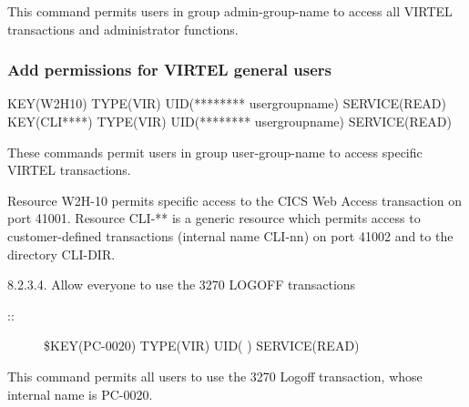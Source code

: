 \documentclass[letterpaper,10pt,english]{sphinxmanual}
\begin{document}

This command permits users in group admin-group-name to access all VIRTEL transactions and administrator functions.

\ignorespaces 

\subsubsection{Add permissions for VIRTEL general users}
\label{\detokenize{Installation_Guide:add-permissions-for-virtel-general-users}}\label{\detokenize{Installation_Guide:index-183}}
\begin{sphinxVerbatim}[commandchars=\\\{\}]
\PYGZdl{}KEY(W2H\PYGZhy{}10) TYPE(VIR) UID(******** user\PYGZhy{}group\PYGZhy{}name) SERVICE(READ)
\PYGZdl{}KEY(CLI\PYGZhy{}****) TYPE(VIR) UID(******** user\PYGZhy{}group\PYGZhy{}name) SERVICE(READ)
\end{sphinxVerbatim}


These commands permit users in group user-group-name to access specific VIRTEL transactions.

Resource W2H-10 permits specific access to the CICS Web Access transaction on port 41001. Resource CLI-** is a generic resource which permits access to customer-defined transactions (internal name CLI-nn) on port 41002 and to the directory CLI-DIR.

8.2.3.4. Allow everyone to use the 3270 LOGOFF transactions
\begin{description}
\item[{::}] \leavevmode
\$KEY(PC-0020) TYPE(VIR) UID(\sphinxstylestrong{****} \sphinxstylestrong{****}) SERVICE(READ)

\end{description}


This command permits all users to use the 3270 Logoff transaction, whose internal name is PC-0020.

\newpage

\ignorespaces 
\end{document}
